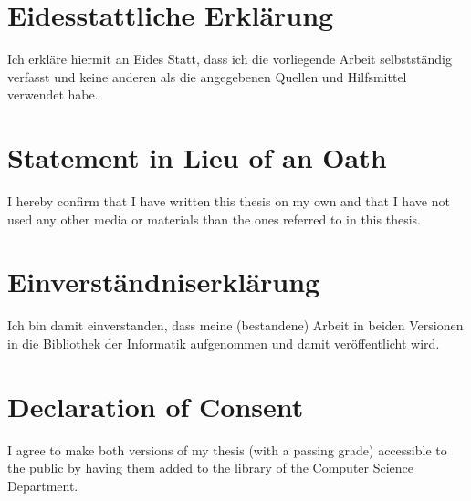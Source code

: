 \cleardoublepage\null

\vspace*{\fill}


\section*{\centering Eidesstattliche Erklärung}

Ich erkläre hiermit an Eides Statt, dass ich die vorliegende Arbeit
selbstständig verfasst und keine anderen als die angegebenen Quellen
und Hilfsmittel verwendet habe.

\section*{\centering Statement in Lieu of an Oath}

I hereby confirm that I have written this thesis on my own and that I
have not used any other media or materials than the ones referred to
in this thesis.

\vspace*{10ex}

\section*{\centering Einverständniserklärung}

Ich bin damit einverstanden, dass meine (bestandene) Arbeit in beiden
Versionen in die Bibliothek der Informatik aufgenommen und damit
veröffentlicht wird.

\section*{\centering Declaration of Consent}

I agree to make both versions of my thesis (with a passing grade)
accessible to the public by having them added to the library of the
Computer Science Department.

\vspace*{20ex}


\vspace*{\fill}
